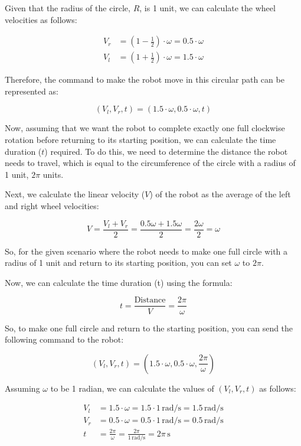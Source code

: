 \documentclass[answers]{exam}
\begin{document}
\begin{questions}
\begin{parts}
\begin{solution}
            Given that the radius of the circle, \(R\), is 1 unit, we can calculate the
            wheel velocities as follows:

            \begin{align*}
                V_r & = (1 - \frac{1}{2}) \cdot \omega = 0.5 \cdot \omega \\
                V_l & = (1 + \frac{1}{2}) \cdot \omega = 1.5 \cdot \omega
            \end{align*}

            Therefore, the command to make the robot move in this circular path can be
            represented as:

            \[(V_l, V_r, t) = (1.5\cdot\omega, 0.5\cdot\omega, t)\]

            Now, assuming that we want the robot to complete exactly one full clockwise
            rotation before returning to its starting position, we can calculate the time
            duration (\(t\)) required. To do this, we need to determine the distance the
            robot needs to travel, which is equal to the circumference of the circle with a
            radius of 1 unit, \(2\pi\) units.

            Next, we calculate the linear velocity (\(V\)) of the robot as the average of
            the left and right wheel velocities:

            \[V = \frac{V_l + V_r}{2} = \frac{0.5\omega + 1.5\omega}{2} = \frac{2\omega}{2} = \omega\]

            So, for the given scenario where the robot needs to make one full circle with a
            radius of 1 unit and return to its starting position, you can set \(\omega\) to
            \(2\pi\).

            Now, we can calculate the time duration (t) using the formula:

            \[t = \frac{\text{Distance}}{V} = \frac{2\pi}{\omega}\]

            So, to make one full circle and return to the starting position, you can send
            the following command to the robot:

            \[(V_l, V_r, t) = (1.5\cdot\omega, 0.5\cdot\omega, \frac{2\pi}{\omega})\]

            Assuming \(\omega\) to be 1 radian, we can calculate the values of \((V_l, V_r,
            t)\) as follows:

            \begin{align*}
                V_l & = 1.5 \cdot \omega = 1.5 \cdot 1 \, \text{rad/s} = 1.5 \, \text{rad/s}    \\
                V_r & = 0.5 \cdot \omega = 0.5 \cdot 1 \, \text{rad/s} = 0.5 \, \text{rad/s}    \\
                t   & = \frac{2\pi}{\omega} = \frac{2\pi}{1 \, \text{rad/s}} = 2\pi \, \text{s}
            \end{align*}


\end{solution}
\end{parts}
\end{questions}
\end{document}

